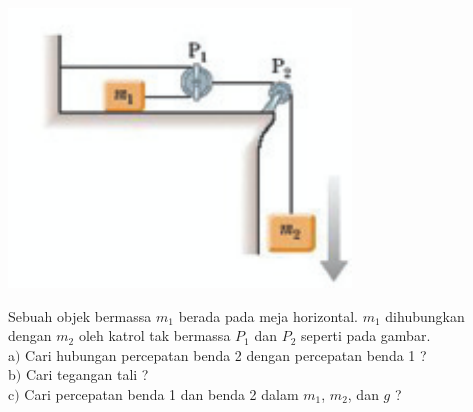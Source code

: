 \item
\mbox{}
\begin{center}
\includegraphics [scale=0.7]{latex/eps/1_5_1_image_1-eps-converted-to.pdf}
\end{center}
Sebuah objek bermassa $m_{1}$ berada pada meja horizontal. $m_{1}$ dihubungkan dengan $m_{2}$ oleh katrol tak bermassa $P_{1}$ dan $P_{2}$ seperti pada gambar.\\
a$)$ Cari hubungan percepatan benda 2 dengan percepatan benda 1 ? \\
b$)$ Cari tegangan tali ?\\
c$)$ Cari percepatan benda 1 dan benda 2 dalam $m_{1}$, $m_{2}$, dan $g$ ?
